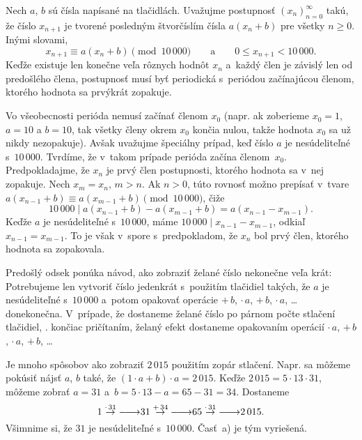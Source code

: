 {%
\def\stepk#1{\overset{\cdot\,#1}\to{\relbar\joinrel\longrightarrow}}%
\def\stepp#1{\overset{+\,#1}\to{\relbar\joinrel\longrightarrow}}%
Nech $a$, $b$ sú čísla napísané na tlačidlách. Uvažujme postupnosť $(x_n)_{n=0}^\infty$ takú, že číslo $x_{n+1}$ je tvorené posledným štvorčíslím čísla $a(x_n+b)$ pre všetky $n\ge0$. Inými slovami,
$$
x_{n+1}\equiv a(x_n+b)\pmod{10\,000}\qquad\text{a}\qquad 0\le x_{n+1}<10\,000.
$$
Keďže existuje len konečne veľa rôznych hodnôt $x_n$ a~každý člen je závislý len od predošlého člena, postupnosť musí byť periodická s~periódou začínajúcou členom, ktorého hodnota sa prvýkrát zopakuje.

Vo všeobecnosti perióda nemusí začínať členom $x_0$ (napr. ak zoberieme $x_0=1$, $a=10$ a $b=10$, tak všetky členy okrem $x_0$ končia nulou, takže hodnota $x_0$ sa už nikdy nezopakuje). Avšak uvažujme špeciálny prípad, keď číslo $a$ je nesúdeliteľné s~$10\,000$. Tvrdíme, že v~takom prípade perióda začína členom~$x_0$. Predpokladajme, že $x_n$ je prvý člen postupnosti, ktorého hodnota sa v~nej zopakuje. Nech $x_m=x_n$, $m>n$. Ak $n>0$, túto rovnosť možno prepísať v~tvare $a(x_{n-1}+b)\equiv a(x_{m-1}+b) \pmod{10\,000}$, čiže
$$
10\,000\mid a(x_{n-1}+b)- a(x_{m-1}+b)=a(x_{n-1}-x_{m-1}).
$$
Keďže $a$ je nesúdeliteľné s~$10\,000$, máme $10\,000\mid x_{n-1}-x_{m-1}$, odkiaľ $x_{n-1}=x_{m-1}$. To je však v~spore s~predpokladom, že $x_n$ bol prvý člen, ktorého hodnota sa zopakovala.

Predošlý odsek ponúka návod, ako zobraziť želané číslo nekonečne veľa krát: Potrebujeme len vytvoriť číslo jedenkrát s~použitím tlačidiel takých, že $a$ je nesúdeliteľné s~$10\,000$ a~potom opakovať operácie $+\,b$, $\cdot\,a$, $+\,b$, $\cdot\,a$, \dots{} donekonečna. V~prípade, že dostaneme želané číslo po párnom počte stlačení tlačidiel, \tj. končiac pričítaním, želaný efekt dostaneme opakovaním operácií $\cdot\,a$, $+\,b$, $\cdot\,a$, $+\,b$, \dots{}

Je mnoho spôsobov ako zobraziť $2\,015$ použitím zopár stlačení. Napr. sa môžeme pokúsiť nájsť $a$, $b$ také, že $(1\cdot a+b)\cdot a=2\,015$. Keďže $2\,015=5\cdot13\cdot31$, môžeme zobrať $a=31$ a~$b=5\cdot13-a=65-31=34$. Dostaneme
$$
1 \stepk{31} 31 \stepp{34} 65 \stepk{31} 2\,015.
$$
Všimnime si, že $31$ je nesúdeliteľné s~$10\,000$. Časť~a) je tým vyriešená.

}
